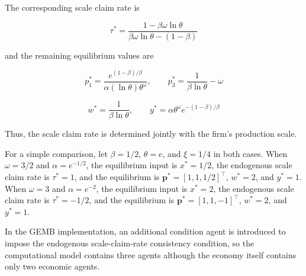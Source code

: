 \documentclass[
  letterpaper,
  DIV=11,
  numbers=noendperiod]{scrreprt}
\begin{document}
The corresponding scale claim rate is

\[
\tau^*=
\frac{1-\beta\omega\ln\theta}
{\beta\omega\ln\theta-(1-\beta)}
\]

and the remaining equilibrium values are

\[
p_1^*=
\frac{e^{(1-\beta)/\beta}}
{\alpha(\ln\theta)\theta^\omega},
\qquad
p_3^*=
\frac{1}{\beta\ln\theta}-\omega
\]

\[
w^*=
\frac{1}{\beta\ln\theta},
\qquad
y^*=
\alpha\theta^\omega e^{-(1-\beta)/\beta}
\]

Thus, the scale claim rate is determined jointly with the firm's
production scale.

For a simple comparison, let \(\beta=1/2\), \(\theta=e\), and
\(\xi=1/4\) in both cases. When \(\omega=3/2\) and \(\alpha=e^{-1/2}\),
the equilibrium input is \(x^*=1/2\), the endogenous scale claim rate is
\(\tau^*=1\), and the equilibrium is \(\mathbf p^*=[1,1,1/2]^\top\),
\(w^*=2\), and \(y^*=1\). When \(\omega=3\) and \(\alpha=e^{-2}\), the
equilibrium input is \(x^*=2\), the endogenous scale claim rate is
\(\tau^*=-1/2\), and the equilibrium is \(\mathbf p^*=[1,1,-1]^\top\),
\(w^*=2\), and \(y^*=1\).

In the GEMB implementation, an additional condition agent is introduced
to impose the endogenous scale-claim-rate consistency condition, so the
computational model contains three agents although the economy itself
contains only two economic agents.
\end{document}
